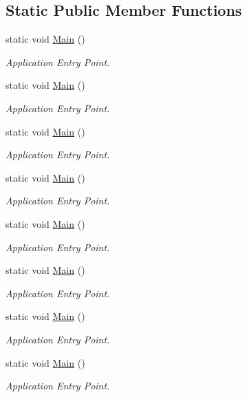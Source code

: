 \subsection*{Static Public Member Functions}
\begin{DoxyCompactItemize}
\item 
static void \hyperlink{classtwelve_1_1_app_a1450389e259d7675bbb347e9b115328f}{Main} ()
\begin{DoxyCompactList}\small\item\em Application Entry Point. \end{DoxyCompactList}\item 
static void \hyperlink{classtwelve_1_1_app_a1450389e259d7675bbb347e9b115328f}{Main} ()
\begin{DoxyCompactList}\small\item\em Application Entry Point. \end{DoxyCompactList}\item 
static void \hyperlink{classtwelve_1_1_app_a1450389e259d7675bbb347e9b115328f}{Main} ()
\begin{DoxyCompactList}\small\item\em Application Entry Point. \end{DoxyCompactList}\item 
static void \hyperlink{classtwelve_1_1_app_a1450389e259d7675bbb347e9b115328f}{Main} ()
\begin{DoxyCompactList}\small\item\em Application Entry Point. \end{DoxyCompactList}\item 
static void \hyperlink{classtwelve_1_1_app_a1450389e259d7675bbb347e9b115328f}{Main} ()
\begin{DoxyCompactList}\small\item\em Application Entry Point. \end{DoxyCompactList}\item 
static void \hyperlink{classtwelve_1_1_app_a1450389e259d7675bbb347e9b115328f}{Main} ()
\begin{DoxyCompactList}\small\item\em Application Entry Point. \end{DoxyCompactList}\item 
static void \hyperlink{classtwelve_1_1_app_a1450389e259d7675bbb347e9b115328f}{Main} ()
\begin{DoxyCompactList}\small\item\em Application Entry Point. \end{DoxyCompactList}\item 
static void \hyperlink{classtwelve_1_1_app_a1450389e259d7675bbb347e9b115328f}{Main} ()
\begin{DoxyCompactList}\small\item\em Application Entry Point. \end{DoxyCompactList}\end{DoxyCompactItemize}


